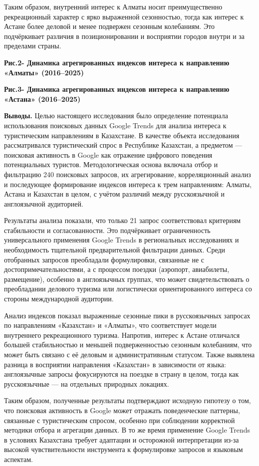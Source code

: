 Таким образом, внутренний интерес к Алматы носит преимущественно
рекреационный характер с ярко выраженной сезонностью, тогда как интерес
к Астане более деловой и менее подвержен сезонным колебаниям. Это
подчёркивает различия в позиционировании и восприятии городов внутри и
за пределами страны.

{\bfseries Рис.2- Динамика агрегированных индексов интереса к направлению
«Алматы» (2016--2025)}

{\bfseries Рис.3- Динамика агрегированных индексов интереса к направлению
«Астана» (2016--2025)}

{\bfseries Выводы.} Целью настоящего исследования было определение
потенциала использования поисковых данных Google Trends для анализа
интереса к туристическим направлениям в Казахстане. В качестве объекта
исследования рассматривался туристический спрос в Республике Казахстан,
а предметом --- поисковая активность в Google как отражение цифрового
поведения потенциальных туристов. Методологическая основа включала отбор
и фильтрацию 240 поисковых запросов, их агрегирование, корреляционный
анализ и последующее формирование индексов интереса к трем направлениям:
Алматы, Астана и Казахстан в целом, с учётом различий между
русскоязычной и англоязычной аудиторией.

Результаты анализа показали, что только 21 запрос соответствовал
критериям стабильности и согласованности. Это подчёркивает
ограниченность универсального применения Google Trends в региональных
исследованиях и необходимость тщательной предварительной фильтрации
данных. Среди отобранных запросов преобладали формулировки, связанные не
с достопримечательностями, а с процессом поездки (аэропорт, авиабилеты,
размещение), особенно в англоязычных группах, что может
свидетельствовать о преобладании делового туризма или логистически
ориентированного интереса со стороны международной аудитории.

Анализ индексов показал выраженные сезонные пики в русскоязычных
запросах по направлениям «Казахстан» и «Алматы», что соответствует
модели внутреннего рекреационного туризма. Напротив, интерес к Астане
отличался большей стабильностью и меньшей подверженностью сезонным
колебаниям, что может быть связано с её деловым и административным
статусом. Также выявлена разница в восприятии направления «Казахстан» в
зависимости от языка: англоязычные запросы фокусируются на поездке в
страну в целом, тогда как русскоязычные --- на отдельных природных
локациях.

Таким образом, полученные результаты подтверждают исходную гипотезу о
том, что поисковая активность в Google может отражать поведенческие
паттерны, связанные с туристическим спросом, особенно при соблюдении
корректной методики отбора и агрегации данных. В то же время применение
Google Trends в условиях Казахстана требует адаптации и осторожной
интерпретации из-за высокой чувствительности инструмента к формулировке
запросов и языковым аспектам.

